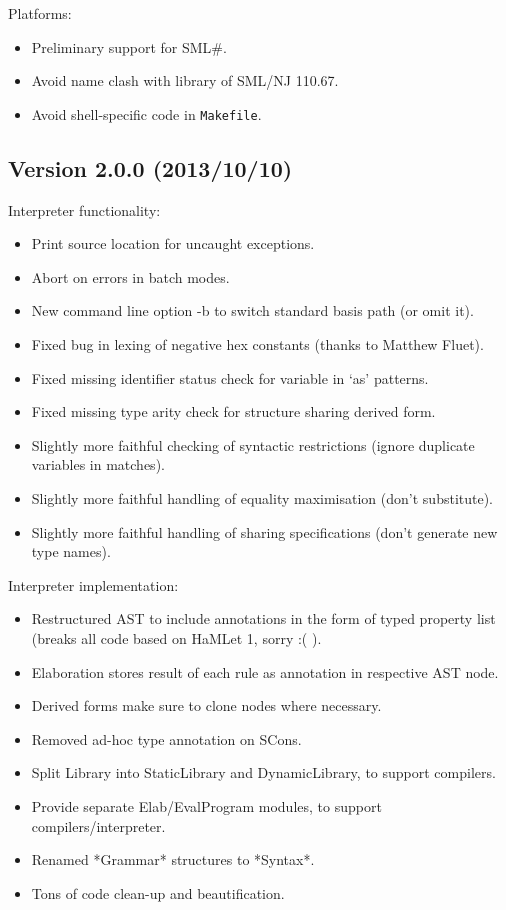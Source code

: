 \documentclass[twoside,titlepage]{article}
\begin{document}
\begin{appendix}
Platforms:
\begin{itemize}[nolistsep]
\item Preliminary support for SML\#.
\item Avoid name clash with library of SML/NJ 110.67.
\item Avoid shell-specific code in {\tt Makefile}.
\end{itemize}


\subsection*{Version 2.0.0 (2013/10/10)}

Interpreter functionality:
\begin{itemize}[nolistsep]
\item Print source location for uncaught exceptions.
\item Abort on errors in batch modes.
\item New command line option -b to switch standard basis path (or omit it).
\item Fixed bug in lexing of negative hex constants (thanks to Matthew Fluet).
\item Fixed missing identifier status check for variable in `as' patterns.
\item Fixed missing type arity check for structure sharing derived form.
\item Slightly more faithful checking of syntactic restrictions (ignore duplicate variables in matches).
\item Slightly more faithful handling of equality maximisation (don't substitute).
\item Slightly more faithful handling of sharing specifications (don't generate new type names).
\end{itemize}

Interpreter implementation:
\begin{itemize}[nolistsep]
\item Restructured AST to include annotations in the form of typed property list (breaks all code based on HaMLet 1, sorry :( ).
\item Elaboration stores result of each rule as annotation in respective AST node.
\item Derived forms make sure to clone nodes where necessary.
\item Removed ad-hoc type annotation on SCons.
\item Split Library into StaticLibrary and DynamicLibrary, to support compilers.
\item Provide separate Elab/EvalProgram modules, to support compilers/interpreter.
\item Renamed *Grammar* structures to *Syntax*.
\item Tons of code clean-up and beautification.
\end{itemize}


\end{appendix}
\end{document}
